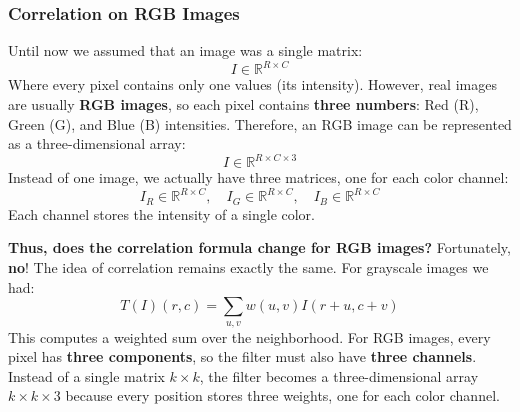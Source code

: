 \subsubsection{Correlation on RGB Images}\label{sec:correlation-on-rgb-images}

Until now we assumed that an image was a single matrix:
\begin{equation*}
    I \in \mathbb{R}^{R \times C}
\end{equation*}
Where every pixel contains only one values (its intensity). However, real images are usually \textbf{RGB images}, so each pixel contains \textbf{three numbers}: Red (R), Green (G), and Blue (B) intensities. Therefore, an RGB image can be represented as a three-dimensional array:
\begin{equation*}
    I \in \mathbb{R}^{R \times C \times 3}
\end{equation*}
Instead of one image, we actually have three matrices, one for each color channel:
\begin{equation*}
    I_R \in \mathbb{R}^{R \times C}, \quad I_G \in \mathbb{R}^{R \times C}, \quad I_B \in \mathbb{R}^{R \times C}
\end{equation*}
Each channel stores the intensity of a single color.

\highspace
\textcolor{Green3}{ \textbf{Thus, does the correlation formula change for RGB images?}} Fortunately, \textbf{no}! The idea of correlation remains exactly the same. For grayscale images we had:
\begin{equation*}
    T\left(I\right)\left(r,c\right) = \sum_{u,v} w\left(u,v\right)I\left(r+u,c+v\right)
\end{equation*}
This computes a weighted sum over the neighborhood. For RGB images, every pixel has \textbf{three components}, so the filter must also have \textbf{three channels}. Instead of a single matrix $k \times k$, the filter becomes a three-dimensional array $k \times k \times 3$ because every position stores three weights, one for each color channel.

